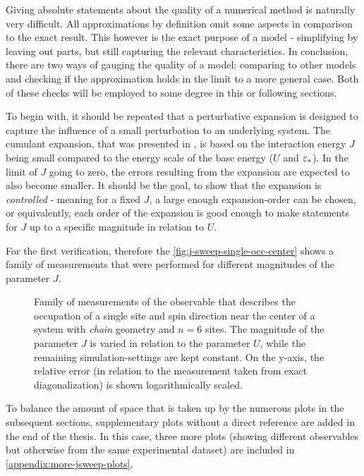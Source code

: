 Giving absolute statements about the quality of a numerical method is naturally very difficult.
All approximations by definition omit some aspects in comparison to the exact result.
This however is the exact purpose of a model - simplifying by leaving out parts, but still capturing the relevant characteristics.
In conclusion, there are two ways of gauging the quality of a model: comparing to other models and checking if the approximation holds in the limit to a more general case.
Both of these checks will be employed to some degree in this or following sections.

To begin with, it should be repeated that a perturbative expansion is designed to capture the influence of a \glqq small\grqq{} perturbation to an underlying system.
The cumulant expansion, that was presented in , is based on the interaction energy $J$ being small compared to the energy scale of the base energy ($U$ and $\epsl[\ast]$).
In the limit of $J$ going to zero, the errors resulting from the expansion are expected to also become smaller.
It should be the goal, to show that the expansion is \emph{controlled} - meaning for a fixed $J$, a large enough expansion-order can be chosen, or equivalently, each order of the expansion is good enough to make statements for $J$ up to a specific magnitude in relation to $U$. 

For the first verification, therefore the \autoref{fig:j-sweep-single-occ-center} shows a family of measurements that were performed for different magnitudes of the parameter $J$.

\begin{figure}[htbp]
    \centering
    \vspace{-0.7cm}
    \caption{
            Family of measurements of the observable that describes the occupation of a single site and spin direction near the center of a system with \emph{chain} geometry and $n=6$ sites.
            The magnitude of the parameter $J$ is varied in relation to the parameter $U$, while the remaining simulation-settings are kept constant.
            On the y-axis, the relative error (in relation to the measurement taken from exact diagonalization) is shown logarithmically scaled.
        }
    \label{fig:j-sweep-single-occ-center}
\end{figure}

To balance the amount of space that is taken up by the numerous plots in the subsequent sections, supplementary plots without a direct reference are added in the end of the thesis.
In this case, three more plots (showing different observables but otherwise from the same experimental dataset) are included in \ref{appendix:more-jsweep-plots}.

